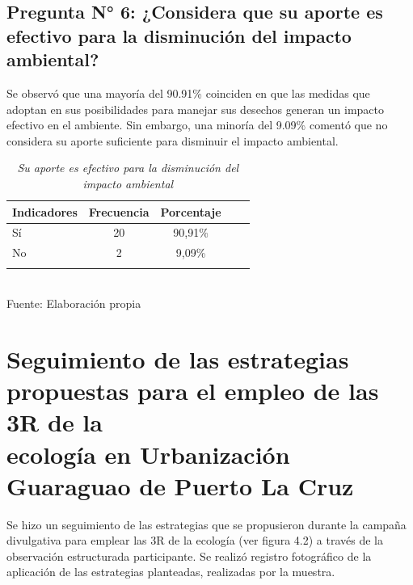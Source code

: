 {\setlength{\parskip}{0cm}
\subsection{Pregunta N° 6: ¿Considera que su aporte es efectivo para la disminución del impacto ambiental?}

Se observó que una mayoría del 90.91\% coinciden en que las medidas que adoptan en sus posibilidades para manejar sus desechos generan un impacto efectivo en el ambiente. Sin embargo, una minoría del 9.09\% comentó que no considera su aporte suficiente para disminuir el impacto ambiental.

\newpage

\begin{table}[h!]
    \centering
    \captionsetup{singlelinecheck=false, justification=raggedright, labelsep=newline}
    \caption{\textit{Su aporte es efectivo para la disminución del impacto ambiental}}
    \begin{tabular}{lcccc}
        \toprule
        Indicadores & Frecuencia & Porcentaje\\
        \midrule
        Sí & 20 & 90,91\% \\
        No & 2 & 9,09\%\\
        \bottomrule\\
    \end{tabular}
    \\\RaggedRight Fuente: Elaboración propia
    \label{table:cuadro14}
\end{table}
}

\newpage

{\setlength{\parskip}{0cm}
\section{Seguimiento de las estrategias propuestas para el empleo de las 3R de la \\[6pt] ecología en Urbanización Guaraguao de Puerto La Cruz}

Se hizo un seguimiento de las estrategias que se propusieron durante la campaña divulgativa para emplear las 3R de la ecología (ver figura 4.2) a través de la observación estructurada participante. Se realizó registro fotográfico de la aplicación de las estrategias planteadas, realizadas por la muestra. 
}

